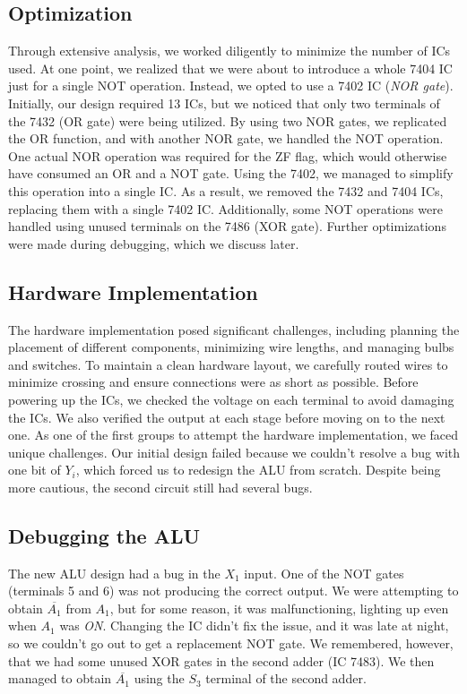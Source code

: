 \documentclass[12pt]{article}
\begin{document}
\subsection{Optimization}

Through extensive analysis, we worked diligently to minimize the number of ICs used. At one point, we realized that we were about to introduce a whole 7404 IC just for a single NOT operation. Instead, we opted to use a 7402 IC (\textit{NOR gate}). Initially, our design required 13 ICs, but we noticed that only two terminals of the 7432 (OR gate) were being utilized. By using two NOR gates, we replicated the OR function, and with another NOR gate, we handled the NOT operation. One actual NOR operation was required for the ZF flag, which would otherwise have consumed an OR and a NOT gate. Using the 7402, we managed to simplify this operation into a single IC. As a result, we removed the 7432 and 7404 ICs, replacing them with a single 7402 IC. Additionally, some NOT operations were handled using unused terminals on the 7486 (XOR gate). Further optimizations were made during debugging, which we discuss later.

\subsection{Hardware Implementation}

The hardware implementation posed significant challenges, including planning the placement of different components, minimizing wire lengths, and managing bulbs and switches. To maintain a clean hardware layout, we carefully routed wires to minimize crossing and ensure connections were as short as possible. Before powering up the ICs, we checked the voltage on each terminal to avoid damaging the ICs. We also verified the output at each stage before moving on to the next one. As one of the first groups to attempt the hardware implementation, we faced unique challenges. Our initial design failed because we couldn’t resolve a bug with one bit of $Y_i$, which forced us to redesign the ALU from scratch. Despite being more cautious, the second circuit still had several bugs.

\subsection{Debugging the ALU}

The new ALU design had a bug in the $X_1$ input. One of the NOT gates (terminals 5 and 6) was not producing the correct output. We were attempting to obtain $\overline{A_1}$ from $A_1$, but for some reason, it was malfunctioning, lighting up even when $A_1$ was \textit{ON}. Changing the IC didn’t fix the issue, and it was late at night, so we couldn’t go out to get a replacement NOT gate. We remembered, however, that we had some unused XOR gates in the second adder (IC 7483). We then managed to obtain $\overline{A_1}$ using the $S_3$ terminal of the second adder.
\end{document}
